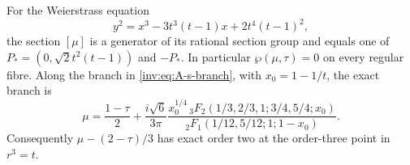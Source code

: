 \begin{proposition}\label{inv:A2.3}
For the Weierstrass equation
\[
y^2=x^3-3t^3(t-1)x+2t^4(t-1)^2,
\]
the section $[\mu]$ is a generator of its rational section group and
equals one of $P_*=(0,\sqrt2t^2(t-1))$ and $-P_*$.
In particular $\wp(\mu,\tau)=0$ on every regular fibre.
Along the branch in \eqref{inv:eq:A-s-branch}, with
$x_0=1-1/t$, the exact branch is
\begin{equation}\label{inv:eq:A-DI-branch}
\mu=\frac{1-\tau}{2}
 +\frac{i\sqrt6}{3\pi}
 \frac{x_0^{1/4}\,{}_3F_2(1/3,2/3,1;3/4,5/4;x_0)}
 {{}_2F_1(1/12,5/12;1;1-x_0)}.
\end{equation}
Consequently $\mu-(2-\tau)/3$ has exact order two at the
order-three point in $r^3=t$.
\end{proposition}
